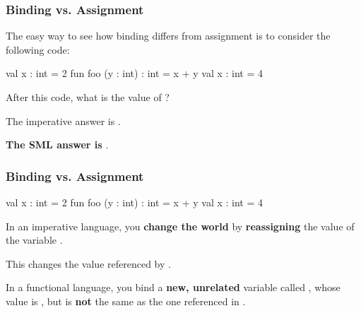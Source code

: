 \documentclass[aspectratio=169]{beamer}
\begin{document}
\begin{frame}[fragile]
  \frametitle{Binding vs. Assignment}

  The easy way to see how binding differs from assignment is to consider 
  the following code:

  \pause
  \vspace{\fill}

  \begin{codeblock}
    val x : int = 2 
    fun foo (y : int) : int = x + y
    val x : int = 4 
  \end{codeblock}

  \pause
  \vspace{\fill}

  After this code, what is the value of ?
  
  \pause
  \vspace{\fill}

  The imperative answer is . 

  \pause
  \vspace{\fill}

  \textbf{The SML answer is }.
\end{frame}

\begin{frame}[fragile]
  \frametitle{Binding vs. Assignment}

  \begin{codeblock}
    val x : int = 2 
    fun foo (y : int) : int = x + y
    val x : int = 4 
  \end{codeblock}

  \pause
  \vspace{\fill}

  In an imperative language, you \textbf{change the world} by \textbf{reassigning} the 
  value of the variable .

  \vspace{5pt}

  This changes the value referenced by .

  \pause
  \vspace{\fill}

  In a functional language, you bind a \textbf{new, unrelated} variable called ,
  whose value is , but is \textbf{not} the same as the one referenced in .

  \vspace{\fill}

\end{frame}
\end{document}
